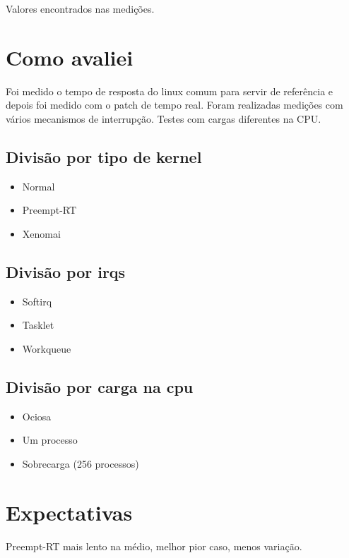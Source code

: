 
Valores encontrados nas medições.

\section{Como avaliei}

Foi medido o tempo de resposta do linux comum para servir de referência e depois foi medido com o patch de tempo real. Foram realizadas medições com vários mecanismos de interrupção. Testes com cargas diferentes na CPU.

\subsection{Divisão por tipo de kernel}

\begin{itemize}
\item Normal
\item Preempt-RT
\item Xenomai
\end{itemize}

\subsection{Divisão por irqs}

\begin{itemize}
\item Softirq
\item Tasklet
\item Workqueue
\end{itemize}

\subsection{Divisão por carga na cpu}

\begin{itemize}
\item Ociosa
\item Um processo
\item Sobrecarga (256 processos)
\end{itemize}

\section{Expectativas}

Preempt-RT mais lento na médio, melhor pior caso, menos variação.

